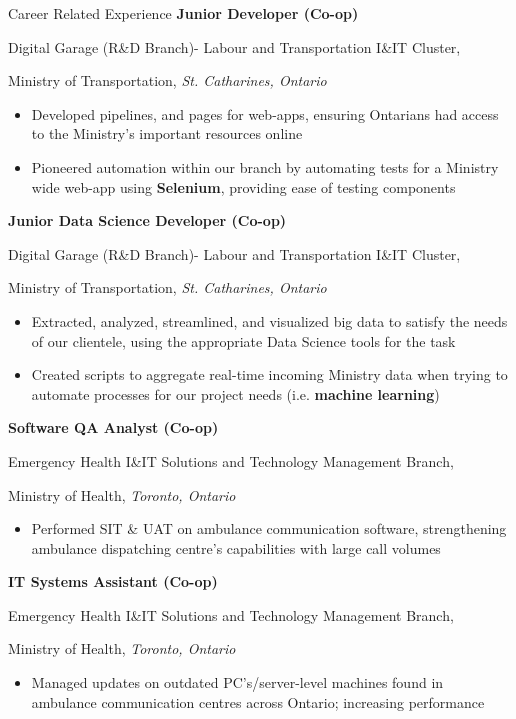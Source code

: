 \begin{rubric}{Career Related Experience}
%
	\textbf{Junior Developer (Co-op)}
	\par Digital Garage (R\&D Branch)- Labour and Transportation I\&IT Cluster,
	\par Ministry of Transportation, \emph{ St. Catharines, Ontario}%
	\begin{itemize}\vspace{-2mm}
     \item Developed pipelines, and pages for web-apps, ensuring Ontarians had access to the Ministry's important resources online
     \vspace{-2mm}
     \item Pioneered automation within our branch by automating tests for a Ministry wide web-app using \textbf{Selenium}, providing ease of testing components
    \end{itemize}
%
\renewcommand{\arraystretch}{-2}
%
	\textbf{Junior Data Science Developer (Co-op)}
	\par Digital Garage (R\&D Branch)- Labour and Transportation I\&IT Cluster,
	\par Ministry of Transportation, \emph{ St. Catharines, Ontario}%
	\begin{itemize}\vspace{-2mm}
     \item Extracted, analyzed, streamlined, and visualized big data to satisfy the needs of our clientele, using the appropriate Data Science tools for the task
     \vspace{-2mm}
     \item Created scripts to aggregate real-time incoming Ministry data when trying to automate processes for our project needs (i.e. \textbf{machine learning})
    \end{itemize}
%
%
	\textbf{Software QA Analyst (Co-op)}
	\par Emergency Health I\&IT Solutions and Technology Management Branch,
	\par Ministry of Health, \emph{Toronto, Ontario}%
	\begin{itemize}\vspace{-2mm}
     \item Performed SIT \& UAT on ambulance communication software, strengthening ambulance dispatching centre's capabilities with large call volumes
    \end{itemize}
%
%
	\textbf{IT Systems Assistant (Co-op)}
	\par Emergency Health I\&IT Solutions and Technology Management Branch,
	\par Ministry of Health, \emph{Toronto, Ontario}
	\begin{itemize}\vspace{-2mm}
     \item Managed updates on outdated PC’s/server-level machines found in ambulance communication centres across Ontario; increasing performance
    \end{itemize}
\end{rubric}